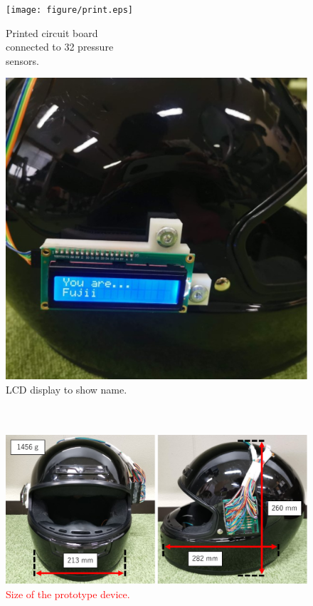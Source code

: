 \documentclass[english,preprint,JIP]{ipsj}
\begin{document}
\begin{figure}[!t]
\begin{minipage}{0.48\hsize}
  \begin{center}
    \texttt{[image: figure/print.eps]}
  \end{center}
  \caption{Printed circuit board\\connected to 32 pressure\\sensors.}
  \label{fig:print}
  \end{minipage}
\begin{minipage}{0.48\hsize}
  \begin{center}
    \includegraphics[width=1\linewidth]{figure/lcd.eps}
  \end{center}
  \caption{LCD display to show name.\\~\\~}
  \label{fig:lcd}
  \end{minipage}
\end{figure}

\begin{figure}[!t]
  \begin{center}
    \includegraphics[width=0.9\linewidth]{figure/size.eps}
  \end{center}
  \caption{\textcolor{red}{Size of the prototype device.}}
  \label{fig:size}
\end{figure}
\end{document}
